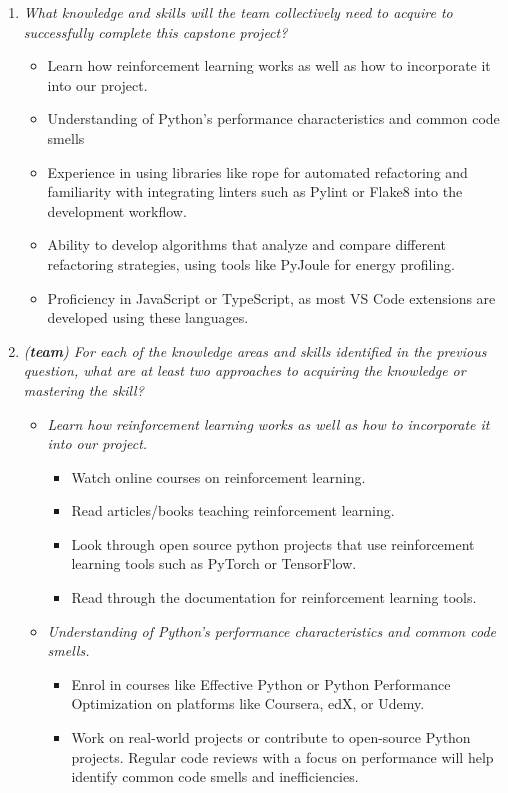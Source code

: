 \documentclass[12pt]{article}
\begin{document}
\begin{enumerate}[wide=0pt, leftmargin=*]
  \item \textit{What knowledge and skills will the team collectively
    need to acquire to successfully complete this capstone project?}

    \begin{itemize}
      \item Learn how reinforcement learning works as well as how to
        incorporate it into our project.
      \item Understanding of Python's performance characteristics and
        common code smells
      \item Experience in using libraries like rope for automated
        refactoring and familiarity with integrating linters such as
        Pylint or Flake8 into the development workflow.
      \item Ability to develop algorithms that analyze and compare
        different refactoring strategies, using tools like PyJoule
        for energy profiling.
      \item Proficiency in JavaScript or TypeScript, as most VS Code
        extensions are developed using these languages.
    \end{itemize}

  \item \textit{(\textbf{team}) For each of the knowledge areas and
      skills identified in the previous question, what are at least two
    approaches to acquiring the knowledge or mastering the skill?}

    \begin{itemize}
      \item \textit{Learn how reinforcement learning works as well as
        how to incorporate it into our project.}
        \begin{itemize}
          \item Watch online courses on reinforcement learning.
          \item Read articles/books teaching reinforcement learning.
          \item Look through open source python projects that use
            reinforcement learning tools such as PyTorch or TensorFlow.
          \item Read through the documentation for reinforcement learning tools.
        \end{itemize}

      \item \textit{Understanding of Python's performance
        characteristics and common code smells.}
        \begin{itemize}
          \item Enrol in courses like Effective Python or Python
            Performance Optimization on platforms like Coursera, edX, or Udemy.
          \item Work on real-world projects or contribute to
            open-source Python projects. Regular code reviews with a
            focus on performance
            will help identify common code smells and inefficiencies.
        \end{itemize}


\end{itemize}
\end{enumerate}
\end{document}
